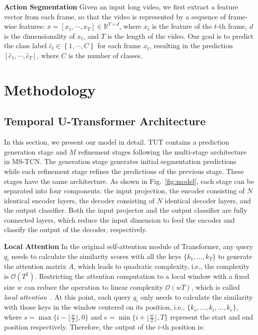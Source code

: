 \documentclass[letterpaper]{article} \usepackage[submission]{aaai23}  \usepackage{times}  \usepackage{helvet}  \usepackage{courier}  \usepackage[hyphens]{url}  \usepackage{graphicx} \urlstyle{rm} \def\UrlFont{\rm}  \usepackage{natbib}  \usepackage{caption} \frenchspacing  \setlength{\pdfpagewidth}{8.5in} \setlength{\pdfpageheight}{11in} \usepackage{algorithm}
\begin{document}
{\bf Action Segmentation} \quad
Given an input long video, we first extract a feature vector from each frame, so that the video is represented by a sequence of frame-wise features: \({x} = [{x}_1, \cdots, {x}_T] \in \mathbb{R}^{T \times d}\), where \({x}_t\) is the feature of the \(t\)-th frame, \(d\) is the dimensionality of \({x}_t\), and \(T\) is the length of the video. Our goal is to predict the class label \(\hat{c}_t \in \left\{1,\cdots,C \right\}\) for each frame \({x}_t\), resulting in the prediction \([\hat{c}_1, \cdots, \hat{c}_T]\), where \(C\) is the number of classes.

\section{Methodology}


\subsection{Temporal U-Transformer Architecture}
In this section, we present our model in detail. TUT contains a prediction generation stage and $M$ refinement stages following the multi-stage architecture in MS-TCN. The generation stage generates initial segmentation predictions while each refinement stage refines the predictions of the previous stage. These stages have the same architecture. As shown in Fig.~\ref{fig:model}, each stage can be separated into four components: the input projection, the encoder consisting of $N$ identical encoder layers, the decoder consisting of $N$ identical decoder layers, and the output classifier. Both the input projector and the output classifier are fully connected layers, which reduce the input dimension to feed the encoder and classify the output of the decoder, respectively.

\textbf{Local Attention}\quad
In the original self-attention module of Transformer, any query $q_i$ needs to calculate the similarity scores with all the keys $\{k_1,\ldots,k_T\}$ to generate the attention matrix $A$, which leads to quadratic complexity, i.e., the complexity is $\mathcal{O}(T^2)$. Restricting the attention computation to a local window with a fixed size $w$ can reduce the operation to linear complexity $\mathcal{O}(wT)$, which is called \textit{local attention}~\cite{beltagy2020longformer}. At this point, each query $q_i$ only needs to calculate the similarity with those keys in the window centered on its position, i.e., $\{k_{s},\ldots,k_i,\ldots,k_{e}\}$, where $s=\max \{i-\lfloor \frac{w}{2} \rfloor, 0\}$ and $e=\min \{i+\lfloor \frac{w}{2} \rfloor, T\}$ represent the start and end position respectively. Therefore, the output of the $i$-th position is:
\end{document}

